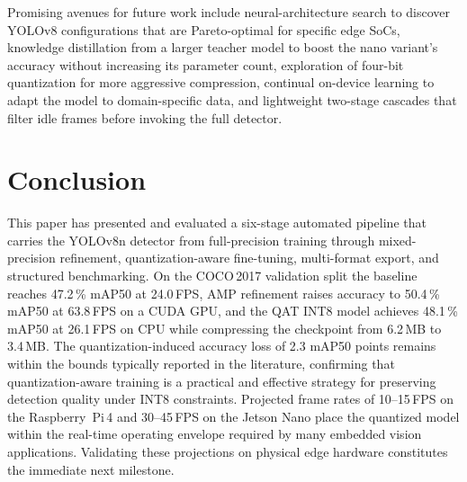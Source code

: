 \documentclass[conference]{IEEEtran}
\begin{document}
Promising avenues for future work include neural-architecture search to discover YOLOv8 configurations that are Pareto-optimal for specific edge SoCs, knowledge distillation from a larger teacher model to boost the nano variant's accuracy without increasing its parameter count, exploration of four-bit quantization for more aggressive compression, continual on-device learning to adapt the model to domain-specific data, and lightweight two-stage cascades that filter idle frames before invoking the full detector.


\section{Conclusion}

This paper has presented and evaluated a six-stage automated pipeline that carries the YOLOv8n detector from full-precision training through mixed-precision refinement, quantization-aware fine-tuning, multi-format export, and structured benchmarking. On the COCO\,2017 validation split the baseline reaches 47.2\,\% mAP50 at 24.0\,FPS, AMP refinement raises accuracy to 50.4\,\% mAP50 at 63.8\,FPS on a CUDA GPU, and the QAT INT8 model achieves 48.1\,\% mAP50 at 26.1\,FPS on CPU while compressing the checkpoint from 6.2\,MB to 3.4\,MB. The quantization-induced accuracy loss of 2.3 mAP50 points remains within the bounds typically reported in the literature, confirming that quantization-aware training is a practical and effective strategy for preserving detection quality under INT8 constraints. Projected frame rates of 10--15\,FPS on the Raspberry~Pi\,4 and 30--45\,FPS on the Jetson Nano place the quantized model within the real-time operating envelope required by many embedded vision applications. Validating these projections on physical edge hardware constitutes the immediate next milestone.

\end{document}
